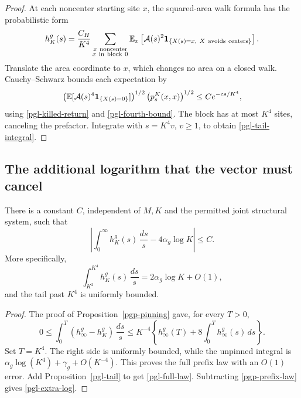 \begin{proof}
At each noncenter starting site \(x\), the squared-area
walk formula has the probabilistic form
\[
 h_K^g(s)=\frac{C_H}{K^4}
 \sum_{\substack{x\ {\rm noncenter}\\x\ {\rm in\ block}\ 0}}
 \mathbb E_x\left[{\cal A}(s)^2
    {\bf1}_{\{X(s)=x,\ X\ {\rm avoids\ centers}\}}\right].
\]
Translate the area coordinate to \(x\), which changes
no area on a closed walk. Cauchy--Schwarz bounds each
expectation by
\[
 \left(\mathbb E[{\cal A}(s)^4
                       {\bf1}_{\{X(s)=0\}}]\right)^{1/2}
                  \left(p_s^K(x,x)\right)^{1/2}
 \le C e^{-c s/K^4},
\]
using \eqref{pgl-killed-return} and
\eqref{pgl-fourth-bound}. The block has at most \(K^4\)
sites, canceling the prefactor. Integrate with
\(s=K^4v\), \(v\ge1\), to obtain
\eqref{pgl-tail-integral}.
\end{proof}

\subsection{The additional logarithm that the vector must cancel}
\label{pgl-full-section}

\begin{theorem}
\label{pgl-full}
There is a constant \(C\), independent of \(M,K\) and
the permitted joint structural system, such that
\begin{equation}
 \left|\int_0^\infty h_K^g(s)\,\frac{ds}{s}
                      -4\alpha_g\log K\right|\le C.
 \label{pgl-full-law}
\end{equation}
More specifically,
\begin{equation}
 \int_{K^2}^{K^4} h_K^g(s)\,\frac{ds}{s}
                         =2\alpha_g\log K+O(1),
 \label{pgl-extra-log}
\end{equation}
and the tail past \(K^4\) is uniformly bounded.
\end{theorem}

\begin{proof}
The proof of Proposition~\ref{pgp-pinning} gave, for
every \(T>0\),
\[
 0\le\int_0^T(h_\infty^g-h_K^g)\,\frac{ds}{s}
 \le K^{-4}\left\{h_\infty^g(T)
                    +8\int_0^T h_\infty^g(s)\,ds\right\}.
\]
Set \(T=K^4\). The right side is uniformly bounded,
while the unpinned integral is
\(\alpha_g\log(K^4)+\gamma_g+O(K^{-4})\).
This proves the full prefix law with an \(O(1)\)
error. Add Proposition~\ref{pgl-tail} to get
\eqref{pgl-full-law}. Subtracting
\eqref{pgp-prefix-law} gives \eqref{pgl-extra-log}.
\end{proof}

